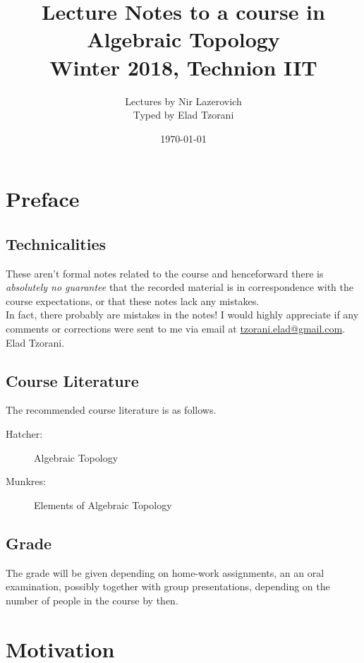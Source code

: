 \documentclass[10pt,a4paper,twoside,openany,hidelinks]{book}
\title{Lecture Notes to a course in Algebraic Topology \\ \large{Winter 2018, Technion IIT}}
\author{Lectures by Nir Lazerovich \\ \large Typed by Elad Tzorani}
\date{\today}
\begin{document}
\frontmatter
{}
\tableofcontents
\countlectures
\newpage

\chapter*{Preface}
 

\section*{Technicalities}

These aren't formal notes related to the course and henceforward there is \emph{absolutely no guarantee} that the recorded material is in correspondence with the course expectations, or that these notes lack any mistakes.\\
In fact, there probably are mistakes in the notes! I would highly appreciate if any comments or corrections were sent to me via email at \href{mailto:tzorani.elad@gmail.com}{tzorani.elad@gmail.com}.\\
Elad Tzorani.

\section*{Course Literature}

The recommended course literature is as follows.
\begin{description}
\item[Hatcher:] Algebraic Topology
\item[Munkres:] Elements of Algebraic Topology
\end{description}

\section*{Grade}

The grade will be given depending on home-work assignments, an an oral examination, possibly together with group presentations, depending on the number of people in the course by then.

\mainmatter

\chapter{Motivation}
\end{document}
